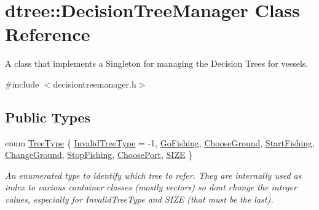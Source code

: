 \hypertarget{classdtree_1_1_decision_tree_manager}{}\section{dtree\+::Decision\+Tree\+Manager Class Reference}
\label{classdtree_1_1_decision_tree_manager}


A class that implements a Singleton for managing the Decision Trees for vessels.  




{\ttfamily \#include $<$decisiontreemanager.\+h$>$}

\subsection*{Public Types}
\begin{DoxyCompactItemize}
\item 
enum \mbox{\hyperlink{classdtree_1_1_decision_tree_manager_a14180eb59d2c245ce3af1c27ddb0846d}{Tree\+Type}} \{ \newline
\mbox{\hyperlink{classdtree_1_1_decision_tree_manager_a14180eb59d2c245ce3af1c27ddb0846da6d72e105dac483a77ada13fbe1bb35b6}{Invalid\+Tree\+Type}} = -\/1, 
\mbox{\hyperlink{classdtree_1_1_decision_tree_manager_a14180eb59d2c245ce3af1c27ddb0846dae4df7decc2cf8c9c24c32bce3e59b72d}{Go\+Fishing}}, 
\mbox{\hyperlink{classdtree_1_1_decision_tree_manager_a14180eb59d2c245ce3af1c27ddb0846daee1d36300aad0b14e8abef741266c672}{Choose\+Ground}}, 
\mbox{\hyperlink{classdtree_1_1_decision_tree_manager_a14180eb59d2c245ce3af1c27ddb0846da1b7c3790e536ce6f1528a53de57a6177}{Start\+Fishing}}, 
\newline
\mbox{\hyperlink{classdtree_1_1_decision_tree_manager_a14180eb59d2c245ce3af1c27ddb0846da8905c8b73d327ff91b53e058f03d7d04}{Change\+Ground}}, 
\mbox{\hyperlink{classdtree_1_1_decision_tree_manager_a14180eb59d2c245ce3af1c27ddb0846dafa865ff8e1a19addaebb8311112c431e}{Stop\+Fishing}}, 
\mbox{\hyperlink{classdtree_1_1_decision_tree_manager_a14180eb59d2c245ce3af1c27ddb0846daebc709cbe2257ea04de9cd1aa40dff92}{Choose\+Port}}, 
\mbox{\hyperlink{classdtree_1_1_decision_tree_manager_a14180eb59d2c245ce3af1c27ddb0846da8148eeaedca84ba8d3b56d6483e1d203}{S\+I\+ZE}}
 \}
\begin{DoxyCompactList}\small\item\em An enumerated type to identify which tree to refer. They are internally used as index to various container classes (mostly vectors) so don\textquotesingle{}t change the integer values, especially for Invalid\+Tree\+Type and S\+I\+ZE (that must be the last). \end{DoxyCompactList}\end{DoxyCompactItemize}
